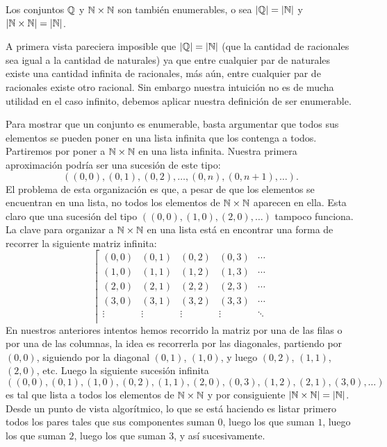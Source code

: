 \begin{teorema}
Los conjuntos $\mathbb{Q}$ y $\mathbb{N}\times\mathbb{N}$ son también enumerables, o sea $|\mathbb{Q}|=|\mathbb{N}|$ y $|\mathbb{N}\times\mathbb{N}|=|\mathbb{N}|$.

\begin{demostracion}
A primera vista pareciera imposible que $|\mathbb{Q}|=|\mathbb{N}|$ (que la cantidad de racionales sea igual a la cantidad de naturales) ya que entre cualquier par de naturales existe una cantidad infinita de racionales, más aún, entre cualquier par de racionales existe otro racional.
Sin embargo nuestra intuición no es de mucha utilidad en el caso infinito, debemos aplicar nuestra definición de ser enumerable.

Para mostrar que un conjunto es enumerable, basta argumentar que todos sus elementos se pueden poner en una lista infinita que los contenga a todos.
Partiremos por poner a $\mathbb{N}\times\mathbb{N}$ en una lista infinita.
Nuestra primera aproximación podría ser una sucesión de este tipo:
\[
((0,0),(0,1),(0,2),\ldots,(0,n),(0,n+1),\ldots).
\]
El problema de esta organización es que, a pesar de que los elementos se encuentran en una lista, no todos los elementos de $\mathbb{N}\times\mathbb{N}$ aparecen en ella.
Esta claro que una sucesión del tipo $((0,0),(1,0),(2,0),\ldots)$ tampoco funciona.
La clave para organizar a $\mathbb{N}\times\mathbb{N}$ en una lista está en encontrar una forma de recorrer la siguiente matriz infinita:
\[
\left\lceil
\begin{array}{ccccccccc}
(0,0) & (0,1) & (0,2) & (0,3) & \cdots\\
(1,0) & (1,1) & (1,2) & (1,3) & \cdots\\
(2,0) & (2,1) & (2,2) & (2,3) & \cdots\\
(3,0) & (3,1) & (3,2) & (3,3) & \cdots\\
\vdots&\vdots&\vdots&\vdots&\ddots \\
\end{array}
\right.
\]
En nuestros anteriores intentos hemos recorrido la matriz por una de las filas o por una de las columnas, la idea es recorrerla por las diagonales, partiendo por $(0,0)$, siguiendo por la diagonal $(0,1)$, $(1,0)$, y luego $(0,2)$, $(1,1)$, $(2,0)$, etc.
Luego la siguiente sucesión infinita
\[
((0,0),(0,1),(1,0),(0,2),(1,1),(2,0),(0,3),(1,2),(2,1),(3,0),\ldots)
\]
es tal que lista a todos los elementos de $\mathbb{N}\times\mathbb{N}$ y por consiguiente $|\mathbb{N}\times\mathbb{N}|=|\mathbb{N}|$.
Desde un punto de vista algorítmico, lo que se está haciendo es listar primero todos los pares tales que sus componentes suman $0$, luego los que suman $1$, luego los que suman $2$, luego los que suman $3$, y así sucesivamente.


\end{demostracion}
\end{teorema}
